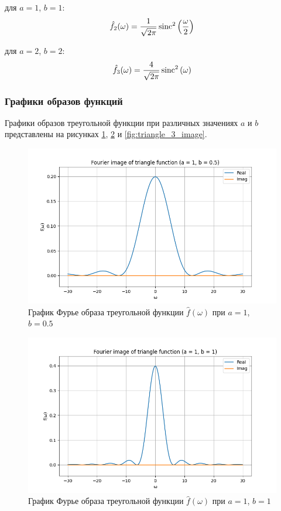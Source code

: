 для $a = 1$, $b = 1$:
\begin{equation}
    \hat{f_2}(\omega) = \frac{1}{\sqrt{2\pi}} \operatorname{sinc}^2\left(\frac{\omega}{2}\right)
\end{equation}

для $a = 2$, $b = 2$:
\begin{equation}
    \hat{f_3}(\omega) = \frac{4}{\sqrt{2\pi}} \operatorname{sinc}^2\left(\omega\right)
\end{equation}

\subsubsection{Графики образов функций}
Графики образов треугольной функции при различных значениях $a$ и $b$ представлены на рисунках \ref{fig:triangle_1_image}, \ref{fig:triangle_2_image} и \ref{fig:triangle_3_image}.

\begin{figure}[ht!]
    \centering
    \includegraphics[width=\textwidth]{media/triangle_1_image.png}
    \caption{График Фурье образа треугольной функции $\hat{f}(\omega)$ при $a = 1$, $b = 0.5$}
    \label{fig:triangle_1_image}
\end{figure}

\begin{figure}[ht!]
    \centering
    \includegraphics[width=\textwidth]{media/triangle_2_image.png}
    \caption{График Фурье образа треугольной функции $\hat{f}(\omega)$ при $a = 1$, $b = 1$}
    \label{fig:triangle_2_image}
\end{figure}

